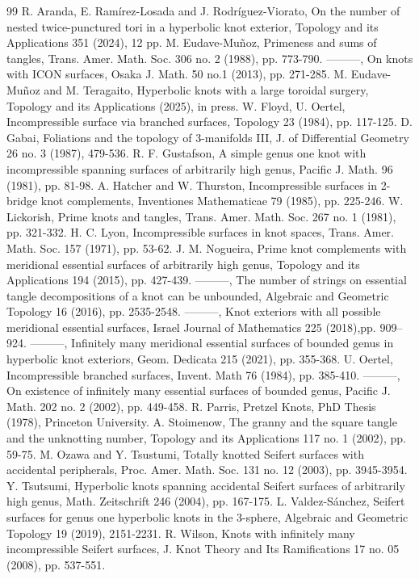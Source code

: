 \documentclass[reqno]{amsart}
\theoremstyle{definition}
\theoremstyle{remark}
\begin{document}
\begin{thebibliography}{99}
 R. Aranda, E. Ramírez-Losada and J. Rodríguez-Viorato, On the number of nested twice-punctured tori in a hyperbolic knot exterior, Topology and its Applications 351 (2024), 12 pp.
 M. Eudave-Muñoz, Primeness and sums of tangles, Trans. Amer. Math. Soc. 306 no. 2 (1988), pp. 773-790. 	
 ---------, On knots with ICON surfaces,  Osaka J.  Math. 50 no.1 (2013), pp. 271-285. 
 M. Eudave-Muñoz and M. Teragaito, Hyperbolic knots with a large toroidal surgery, Topology and its Applications (2025), in press. 
 W. Floyd, U. Oertel, Incompressible surface via branched surfaces, Topology 23 (1984), pp. 117-125.
 D. Gabai,  Foliations and the topology of 3-manifolds III,  J.  of Differential Geometry 26 no. 3 (1987),  479-536.  
 R. F.  Gustafson, A simple genus one knot with incompressible spanning surfaces of arbitrarily high genus, Pacific J.  Math.  96 (1981),  pp. 81-98.
 A.  Hatcher and W.  Thurston,  Incompressible surfaces in 2-bridge knot complements,  Inventiones Mathematicae 79 (1985),  pp.  225-246.
 W. Lickorish, Prime knots and tangles, 
Trans. Amer. Math. Soc. 267 no. 1 (1981),  pp. 321-332.
H. C. Lyon,  Incompressible surfaces in knot spaces,
Trans. Amer. Math. Soc. 157 (1971), pp. 53-62.
J. M. Nogueira,  Prime knot complements with meridional essential surfaces of arbitrarily high genus, Topology and its Applications 194 (2015), pp. 427-439.
 ---------, The number of strings on essential tangle decompositions of a knot can be unbounded,  Algebraic and Geometric Topology 16 (2016), pp. 2535-2548.
---------, Knot exteriors with all possible meridional essential surfaces,  Israel Journal of Mathematics  225 (2018),pp.  909–924.
 ---------,  Infinitely many meridional essential surfaces of bounded genus in hyperbolic knot exteriors, Geom.  Dedicata 215 (2021),  pp.  355-368. 
 U. Oertel,  Incompressible branched surfaces,
Invent. Math 76 (1984), pp. 385-410.
---------,  On existence of infinitely many essential surfaces of bounded genus,  Pacific J.  Math.  202 no. 2 (2002),  pp. 449-458.
 R. Parris,  Pretzel Knots,  PhD Thesis (1978),  Princeton University.
 A. Stoimenow,  The granny and the square tangle and the unknotting number, Topology and its Applications 117 no.  1 (2002),  pp.  59-75.
 M. Ozawa and Y. Tsustumi,  Totally knotted Seifert surfaces with accidental peripherals,  Proc.  Amer.  Math.  Soc.  131 no. 12 (2003),  pp. 3945-3954.
 Y. Tsutsumi,  Hyperbolic knots spanning accidental Seifert surfaces of arbitrarily high genus,  Math.  Zeitschrift 246 (2004), pp. 167-175.
 L. Valdez-Sánchez, Seifert surfaces for genus one hyperbolic knots in the 3-sphere, Algebraic and Geometric Topology 19 (2019), 2151-2231. 
 R. Wilson,  Knots with infinitely many incompressible Seifert surfaces,  J.   Knot Theory and Its Ramifications 17 no.  05 (2008),  pp.  537-551.

\end{thebibliography}
\end{document}
